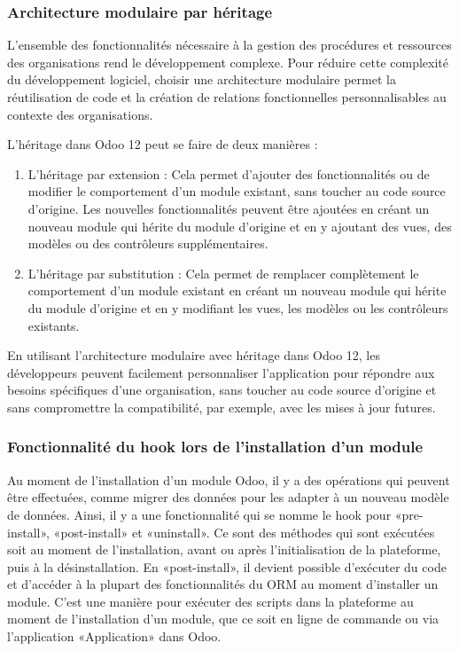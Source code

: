 \subsubsection{Architecture modulaire par héritage}

L'ensemble des fonctionnalités nécessaire à la gestion des procédures et ressources des organisations rend le développement complexe. Pour réduire cette complexité du développement logiciel, choisir une architecture modulaire permet la réutilisation de code et la création de relations fonctionnelles personnalisables au contexte des organisations.

L’héritage dans Odoo 12 peut se faire de deux manières : 
\begin{enumerate}
    \item L’héritage par extension : Cela permet d’ajouter des fonctionnalités ou de modifier le comportement d’un module existant, sans toucher au code source d’origine. Les nouvelles fonctionnalités peuvent être ajoutées en créant un nouveau module qui hérite du module d’origine et en y ajoutant des vues, des modèles ou des contrôleurs supplémentaires.
    \item L’héritage par substitution : Cela permet de remplacer complètement le comportement d’un module existant en créant un nouveau module qui hérite du module d’origine et en y modifiant les vues, les modèles ou les contrôleurs existants.
\end{enumerate}
En utilisant l’architecture modulaire avec héritage dans Odoo 12, les développeurs peuvent facilement personnaliser l’application pour répondre aux besoins spécifiques d'une organisation, sans toucher au code source d’origine et sans compromettre la compatibilité, par exemple, avec les mises à jour futures.


\subsubsection{Fonctionnalité du hook lors de l’installation d’un module}

Au moment de l’installation d’un module Odoo, il y a des opérations qui peuvent être effectuées, comme migrer des données pour les adapter à un nouveau modèle de données. Ainsi, il y a une fonctionnalité qui se nomme le hook pour «pre-install», «post-install» et «uninstall». Ce sont des méthodes qui sont exécutées soit au moment de l’installation, avant ou après l’initialisation de la plateforme, puis à la désinstallation. En «post-install», il devient possible d’exécuter du code et d'accéder à la plupart des fonctionnalités du ORM au moment d’installer un module. C’est une manière pour exécuter des scripts dans la plateforme au moment de l’installation d’un module, que ce soit en ligne de commande ou via l’application «Application» dans Odoo.

